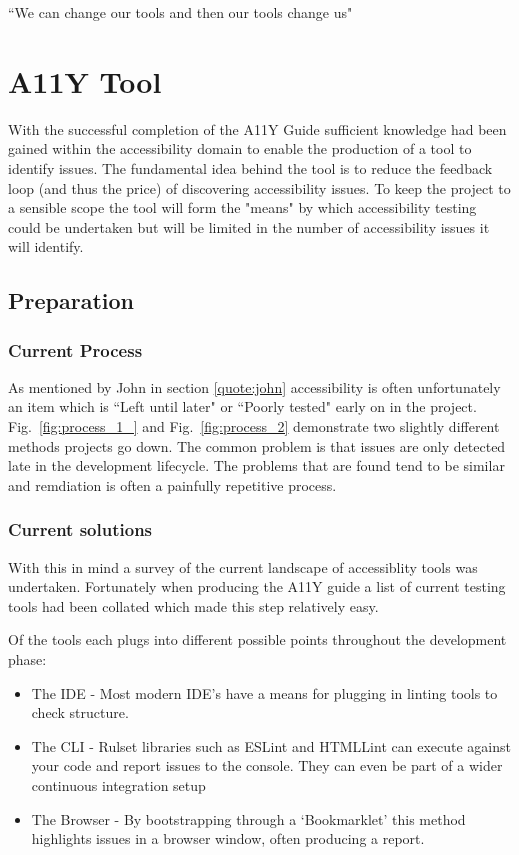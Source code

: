 \begin{savequote}[75mm]
``We can change our tools and then our tools change us"
\end{savequote}

\chapter{A11Y Tool}
With the successful completion of the A11Y Guide sufficient knowledge had
been gained within the accessibility domain to enable the production of a
tool to identify issues. The fundamental idea behind the tool is to reduce
the feedback loop (and thus the price) of discovering accessibility issues. To
keep the project to a sensible scope the tool will form the "means" by which
accessibility testing could be undertaken but will be limited in the number
of accessibility issues it will identify.

\section{Preparation}
\subsection{Current Process}
As mentioned by John in section \ref{quote:john} accessibility is often
unfortunately an item which is ``Left until later" or ``Poorly tested" early
on in the project. Fig.~\ref{fig:process_1_} and Fig.~\ref{fig:process_2}
demonstrate two slightly different methods projects go down. The common
problem is that issues are only detected late in the development lifecycle.
The problems that are found tend to be similar and remdiation is often a
painfully repetitive process.

\subsection{Current solutions}
\label{sec:currentSolutions}
With this in mind a survey of the current landscape of accessiblity tools was
undertaken. Fortunately when producing the A11Y guide a list of current
testing tools had been collated which made this step relatively easy.

Of the tools each plugs into different possible points throughout the
development phase:
 \begin{itemize}
 \item The IDE - Most modern IDE's have a means for plugging in linting tools
  to check structure.
 \item The CLI - Rulset libraries such as ESLint and HTMLLint can execute
 against your code and report issues to the console. They can even be part of
  a wider continuous integration setup
  \item The Browser - By bootstrapping through a `Bookmarklet' this method
  highlights issues in a browser window, often producing a report.
 \end{itemize}

